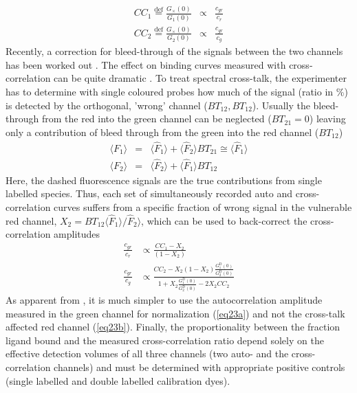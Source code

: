 	\begin{eqnarray}
	\label{eq21}
	CC_1 \stackrel{\mathrm{def}}{=} \frac{G_\times(0)}{G_1(0)} & \propto & \frac{c_{gr}}{c_r} \nonumber \\ CC_2 \stackrel{\mathrm{def}}{=} \frac{G_\times(0)}{G_2(0)} &\propto & \frac{c_{gr}}{c_g}
	\end{eqnarray}
Recently, a correction for bleed-through of the signals between the two channels has been worked out \cite{Bacia2012}. The effect on binding curves measured with cross-correlation can be quite dramatic \cite{Weidemann2013}. To treat spectral cross-talk, the experimenter has to determine with single coloured probes how much of the signal (ratio in \%) is detected by the orthogonal, 'wrong' channel ($BT_{12}, BT_{12}$). Usually the bleed-through from the red into the green channel can be neglected ($BT_{21} = 0$) leaving only a contribution of bleed through from the green into the red channel ($BT_{12}$)
	\begin{eqnarray}
	\label{eq22}
	\langle F_1 \rangle & = & \langle \hat{F}_1 \rangle + \langle \hat{F}_2 \rangle BT_{21} \cong  \langle \hat{F}_1 \rangle \nonumber \\ \langle F_2 \rangle & = & \langle \hat{F}_2 \rangle + \langle \hat{F}_1 \rangle BT_{12}
	\end{eqnarray}
Here, the dashed fluorescence signals are the true contributions from single labelled species. Thus, each set of simultaneously recorded auto and cross-correlation curves suffers from a specific fraction of wrong signal in the vulnerable red channel, $X_2 = BT_{12} \langle \hat{F}_1 \rangle/\hat{F}_2 \rangle$, which can be used to back-correct the cross-correlation amplitudes  \cite{Bacia2012,Weidemann2013}
\begin{subequations}
\label{eq23}
  \begin{align}
    \frac{c_{gr}}{c_r} & \propto  \frac{CC_1-X_2}{\left( 1-X_2 \right)} \label{eq23a} \\
    \frac{c_{gr}}{c_g} & \propto  \frac{CC_2-X_2 \left( 1-X_2 \right) \frac{G_1^{\mathrm{D}}(0)}{G_2^{\mathrm{D}}(0)}}{1+ X_2 \frac{G_1^{\mathrm{D}}(0)}{G_2^{\mathrm{D}}(0)} - 2 X_2 CC_2} \label{eq23b}
  \end{align}
\end{subequations}
As apparent from , it is much simpler to use the autocorrelation amplitude measured in the green channel for normalization (\ref{eq23a}) and not the cross-talk affected red  channel (\ref{eq23b}). Finally, the proportionality between the fraction ligand bound and the measured cross-correlation ratio depend solely on the effective detection volumes of all three channels (two auto- and the cross-correlation channels) and must be determined with appropriate positive controls (single labelled and double labelled calibration dyes).

